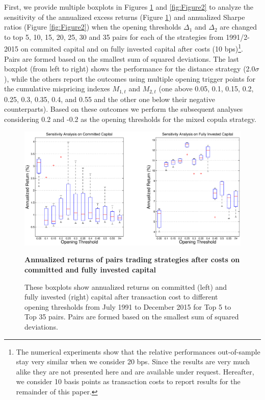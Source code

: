 First, we provide multiple boxplots in Figures \ref{fig:Figure1} and \ref{fig:Figure2} to analyze the sensitivity of the annualized excess returns (Figure \ref{fig:Figure1}) and annualized Sharpe ratios (Figure \ref{fig:Figure2}) when the opening thresholds $\Delta_{1}$ and $\Delta_{2}$ are changed to top 5, 10, 15, 20, 25, 30 and 35 pairs for each of the strategies from 1991/2-2015 on commited capital and on fully invested capital after costs (10 bps)\footnote{The numerical experiments show that the relative performances out-of-sample stay very similar when we consider 20 bps. Since the results are very much alike they are not presented here and are available under request. Hereafter, we consider 10 basis points as transaction costs to report results for the remainder of this paper.}. Pairs are formed based on the smallest sum of squared deviations. The last boxplot (from left to right) shows the performance for the distance strategy (2.0$\sigma$), while the others report the outcomes using multiple opening trigger points for the cumulative mispricing indexes $M_{1,t}$ and $M_{2,t}$ (one above 0.05, 0.1, 0.15, 0.2, 0.25, 0.3, 0.35, 0.4, and 0.55 and the other one below their negative counterparts). Based on these outcomes we perform the subsequent analyses considering 0.2 and -0.2 as the opening thresholds for the mixed copula strategy.

\begin{figure}[!ht]
	\centering
	\includegraphics[width=\linewidth]{Figure1.eps}
	\captionsetup{justification=raggedright,
		singlelinecheck=false
	}
	\caption{\textbf{Annualized returns of pairs trading strategies after costs on committed and fully invested capital}}
	\caption*{\scriptsize These boxplots show annualized returns on committed (left) and fully invested (right) capital after transaction cost to different opening thresholds from July 1991 to December 2015 for Top 5 to Top 35 pairs. Pairs are formed based on the smallest sum of squared deviations.}
	\label{fig:Figure1}
\end{figure}

